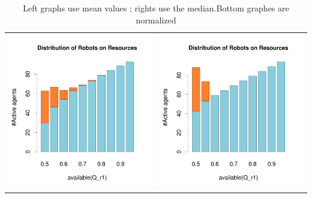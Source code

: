 \documentclass[a4paper,10pt]{article}
\begin{document}
\begin{table}[H]
\caption{Left graphs use mean values ; rights use the median.Bottom graphes are normalized}
\begin{tabular}{cc}
\includegraphics[width=\imgSize]{../images/5StaticEnv/barplotAliveR1AndR2_mean_env0}& \includegraphics[width=\imgSize]{../images/5StaticEnv/barplotAliveR1AndR2_median_env0}\\

\end{tabular}
\end{table}
\end{document}
